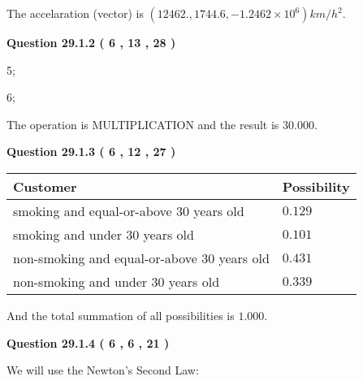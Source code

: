 \documentclass[12pt]{article}
\begin{document}
 
The accelaration (vector) is
$(
12462.,
1744.6 ,
-1.2462 \times 10^{6}
)km/h^2.
$
 
 
 
 
  
\vspace{0.2in}
  
{\textbf{\Large{Question
29.1.2 
 (           6 ,          13 ,          28 )
}}}
  
  
 
 
\noindent{}

5;
 
6;
 
The operation is  %
MULTIPLICATION and the result is
$ %
30.000$.
 
 
 
  
\vspace{0.2in}
  
{\textbf{\Large{Question
29.1.3 
 (           6 ,          12 ,          27 )
}}}
  
  
 
 
\noindent{}

 
\noindent
\begin{tabular}{|l|l|}
\hline
Customer & Possibility \\
\hline
smoking  and  %
equal-or-above 30 years old &
  $ %
0.129$ \\
\hline
smoking  and  %
under 30 years old &
  $ %
0.101$ \\
\hline
 non-smoking and  %
equal-or-above 30 years old &
  $ %
0.431$ \\
\hline
 non-smoking and  %
under 30 years old &
  $ %
0.339$ \\
\hline
\end{tabular}
 
\noindent
 And the total summation of all possibilities is $  %
1.000 $.
 
 
 
  
\vspace{0.2in}
  
{\textbf{\Large{Question
29.1.4 
 (           6 ,           6 ,          21 )
}}}
  
  
 
 
\noindent{}

We will use the Newton's Second Law:
 
\end{document}
